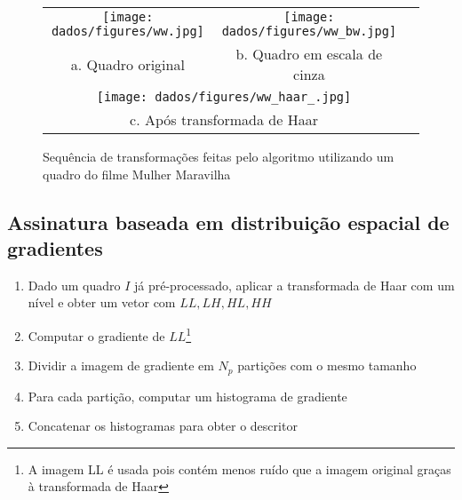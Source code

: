 \begin{figure}[h]
  \centering
  \begin{tabular}{ccc}
  	\centering
    \texttt{[image: dados/figures/ww.jpg]} & \texttt{[image: dados/figures/ww\_bw.jpg]} \\ 
     a. Quadro original & b. Quadro em escala de cinza \\
    \multicolumn{2}{c}{\texttt{[image: dados/figures/ww\_haar\_.jpg]}} \\
    \multicolumn{2}{c}{c. Após transformada de Haar}
  \end{tabular}
  \caption{Sequência de transformações feitas pelo algoritmo utilizando um quadro do filme Mulher Maravilha}
  \label{figure:haar}
\end{figure}

\subsection{Assinatura baseada em distribuição espacial de gradientes}

\begin{enumerate}
\item Dado um quadro $I$ já pré-processado, aplicar a transformada de Haar com um nível e obter um vetor com $LL,LH,HL,HH$
\item Computar o gradiente de $LL$\footnote{A imagem LL é usada pois contém menos ruído que a imagem original graças à transformada de Haar}
\item Dividir a imagem de gradiente em $N_p$ partições com o mesmo tamanho
\item Para cada partição, computar um histograma de gradiente
\item Concatenar os histogramas  para obter o descritor
\end{enumerate}